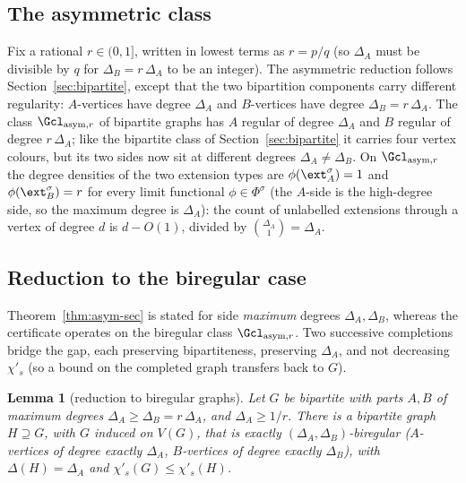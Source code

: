 \documentclass[11pt,a4paper]{article}
\newtheorem{lemma}[theorem]{Lemma}
\theoremstyle{definition}
\theoremstyle{remark}
\begin{document}
\subsection{The asymmetric class}
\label{sec:asym-class}

Fix a rational $r \in (0, 1]$, written in lowest terms as $r = p/q$
(so $\Delta_A$ must be divisible by $q$ for $\Delta_B = r\,\Delta_A$
to be an integer). The asymmetric reduction follows
Section~\ref{sec:bipartite}, except that the two bipartition
components carry different regularity: $A$-vertices have degree
$\Delta_A$ and $B$-vertices have degree $\Delta_B = r\,\Delta_A$.
The class $\Gcl_{\mathrm{asym}, r}$ of bipartite graphs
has $A$ regular of degree $\Delta_A$ and $B$ regular of degree
$r\,\Delta_A$; like the bipartite class of Section~\ref{sec:bipartite}
it carries four vertex colours, but its two sides now sit at different
degrees $\Delta_A \neq \Delta_B$.
On $\Gcl_{\mathrm{asym}, r}$ the
degree densities of the two extension types are
$\phi(\ext_{A}^\sigma) = 1$ and $\phi(\ext_{B}^\sigma) = r$ for every
limit functional $\phi \in \Phi^\sigma$ (the $A$-side is the
high-degree side, so the maximum degree is $\Delta_A$): the count of
unlabelled extensions through a vertex of degree $d$ is $d - O(1)$,
divided by $\binom{\Delta_A}{1} = \Delta_A$.

\subsection{Reduction to the biregular case}
\label{sec:asym-reduction}

Theorem~\ref{thm:asym-sec} is stated for side \emph{maximum} degrees
$\Delta_A, \Delta_B$, whereas the certificate operates on the
biregular class $\Gcl_{\mathrm{asym}, r}$. Two successive completions
bridge the gap, each preserving bipartiteness, preserving
$\Delta_A$, and not decreasing $\chi'_s$ (so a bound on the completed
graph transfers back to $G$).

\begin{lemma}[reduction to biregular graphs]
\label{lem:asym-wlog-biregular}
Let $G$ be bipartite with parts $A, B$ of maximum degrees
$\Delta_A \geq \Delta_B = r\,\Delta_A$, and $\Delta_A \geq 1/r$.
There is a bipartite graph $H \supseteq G$, with $G$ induced on
$V(G)$, that is exactly $(\Delta_A, \Delta_B)$-biregular
($A$-vertices of degree exactly $\Delta_A$, $B$-vertices of degree
exactly $\Delta_B$), with $\Delta(H) = \Delta_A$ and
$\chi'_s(G) \leq \chi'_s(H)$.
\end{lemma}
\end{document}
